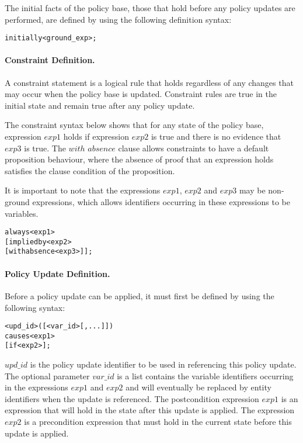 \documentclass[global,twocolumn,final]{svjour}
\newenvironment{vverbatim}
  {\begin{alltt}}
  {\vspace{-\baselineskip}\end{alltt}}
\begin{document}
          The initial facts of the policy base, those that hold before any
          policy updates are performed, are defined by using the following
          definition syntax:

          \begin{vverbatim}
  initially <ground\_exp>;
          \end{vverbatim}

        \paragraph{Constraint Definition.}

          A constraint statement is a logical rule that holds regardless of any
          changes that may occur when the policy base is updated. Constraint
          rules are true in the initial state and remain true after any policy
          update.

          The constraint syntax below shows that for any state of the policy
          base, expression $exp1$ holds if expression $exp2$ is true and there
          is no evidence that $exp3$ is true. The $with$ $absence$ clause
          allows constraints to have a default proposition behaviour, where
          the absence of proof that an expression holds  satisfies the clause
          condition of the proposition.

          It is important to note that the expressions $exp1$, $exp2$ and
          $exp3$ may be non-ground expressions, which allows identifiers
          occurring in these expressions to be variables.

          \begin{vverbatim}
  always <exp1>
    [implied by <exp2>
    [with absence <exp3>]];
          \end{vverbatim}

        \paragraph{Policy Update Definition.}

          Before a policy update can be applied, it must first be defined by
          using the following syntax:

          \begin{vverbatim}
  <upd\_id>([<var\_id>[, ...]])
    causes <exp1>
    [if <exp2>];
          \end{vverbatim}

          $upd\_id$ is the policy update identifier to be used in referencing
          this policy update. The optional parameter $var\_id$ is a list
          contains the variable identifiers occurring in the expressions $exp1$
          and $exp2$ and will eventually be replaced by entity identifiers when
          the update is referenced. The postcondition expression $exp1$ is an
          expression that will hold in the state after this update is applied.
          The expression $exp2$ is a precondition expression that must hold in
          the current state before this update is applied.
\end{document}
